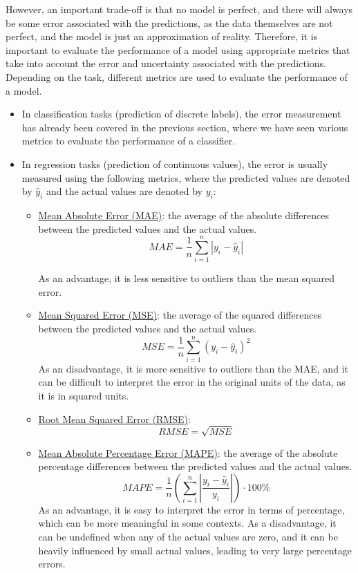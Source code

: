 However, an important trade-off is that no model is perfect, and there will always be some error associated with the predictions, as the data themselves are not perfect, and the model is just an approximation of reality. Therefore, it is important to evaluate the performance of a model using appropriate metrics that take into account the error and uncertainty associated with the predictions. Depending on the task, different metrics are used to evaluate the performance of a model.
\begin{itemize}
    \item In classification tasks (prediction of discrete labels), the error measurement has already been covered in the previous section, where we have seen various metrics to evaluate the performance of a classifier.
    \item In regression tasks (prediction of continuous values), the error is usually measured using the following metrics, where the predicted values are denoted by $\hat{y}_i$ and the actual values are denoted by $y_i$:
    \begin{itemize}
        \item \ul{Mean Absolute Error (MAE)}: the average of the absolute differences between the predicted values and the actual values.
        \begin{equation} \label{label:mae}
            MAE = \frac{1}{n} \sum_{i=1}^{n} |y_i - \hat{y}_i|
        \end{equation}

        As an advantage, it is less sensitive to outliers than the mean squared error.
        \item \ul{Mean Squared Error (MSE)}: the average of the squared differences between the predicted values and the actual values.
        \begin{equation} \label{label:mse}
            MSE = \frac{1}{n} \sum_{i=1}^{n} (y_i - \hat{y}_i)^2
        \end{equation}
        As an disadvantage, it is more sensitive to outliers than the MAE, and it can be difficult to interpret the error in the original units of the data, as it is in squared units.
        \item \ul{Root Mean Squared Error (RMSE)}: 
        \begin{equation} \label{label:rmse}
            RMSE = \sqrt{MSE}
        \end{equation}
        \item \ul{Mean Absolute Percentage Error (MAPE)}: the average of the absolute percentage differences between the predicted values and the actual values.
        \begin{equation} \label{label:mape}
            MAPE = \frac{1}{n} \left(\sum_{i=1}^{n} \left| \frac{y_i - \hat{y}_i}{y_i} \right|\right)\cdot 100\%
        \end{equation}
        As an advantage, it is easy to interpret the error in terms of percentage, which can be more meaningful in some contexts. As a disadvantage, it can be undefined when any of the actual values are zero, and it can be heavily influenced by small actual values, leading to very large percentage errors.
    \end{itemize}
\end{itemize}


